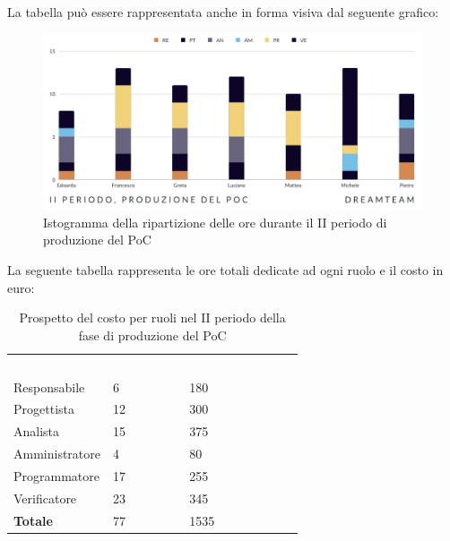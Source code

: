 La tabella può essere rappresentata anche in forma visiva dal seguente grafico:
\begin{figure}[H]
\centering
\includegraphics[scale=0.65]{Sezioni/SezioniPreventivo/grafici/Poc_II_periodo.png}
\caption{Istogramma della ripartizione delle ore durante il II periodo di produzione del PoC}
\end{figure}

La seguente tabella rappresenta le ore totali dedicate ad ogni ruolo e il costo in euro:

\begin{table}[H]
\begin{center}
\renewcommand{\arraystretch}{1.5}
\begin{tabular}{ m{}<{\centering}  m{}<{\centering} m{}<{\centering}}
	\rowcolor{darkblue}
	\textcolor{white}{\textbf{Ruolo}}&\textcolor{white}{\textbf{Totale ore}}&\textcolor{white}{\textbf{Costo totale (\euro)}}\\ 

	Responsabile  & 6 & 180 \\	
	
	Progettista & 12 & 300 \\
	
	Analista & 15 & 375 \\

	Amministratore & 4 & 80 \\
	
	Programmatore & 17 & 255 \\
	
	Verificatore & 23 & 345 \\
	
	\textbf{Totale} & 77 & 1535 \\
	
\end{tabular}
\caption{Prospetto del costo per ruoli nel II periodo della fase di produzione del PoC}
\end{center}
\end{table}

